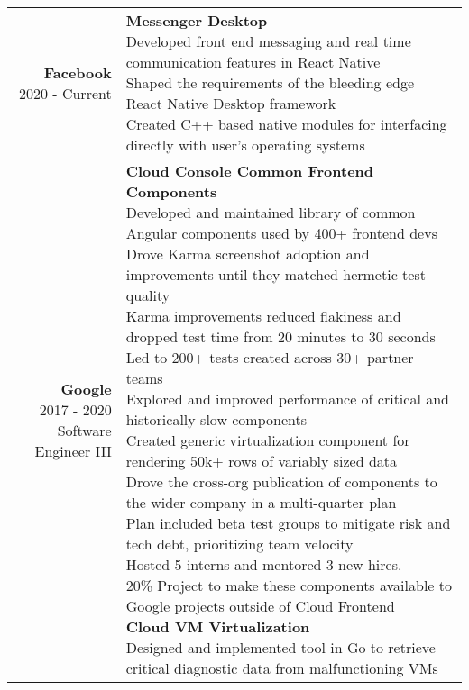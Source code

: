 \documentclass{article}
\makeatletter
\newcommand*\lineBr[2][c]{\begin{tabular}[#1]{@{}r@{}}#2\end{tabular}}
\newcommand*\lineBl[2][c]{\begin{tabular}[#1]{@{}l@{}}#2\end{tabular}}
\makeatother
\begin{document}
\begin{tabularx}{\textwidth}{ r | X }
  \vspace{4mm}
  \lineBr{ {\large {\bf Facebook }\\[2mm]2020 - Current}} &
  \lineBl{
    {\bf Messenger Desktop} \\[2mm]
    Developed front end messaging and real time communication features in React Native \\[2mm]
    Shaped the requirements of the bleeding edge React Native Desktop framework \\[2mm]
    Created C++ based native modules for interfacing directly with user's operating systems \\[2mm]
  } \\
  \vspace{4mm}
  \lineBr{ {\large {\bf Google }\\[2mm]2017 - 2020\\[2mm]Software Engineer III}} &
  \lineBl{
    {\bf Cloud Console Common Frontend Components} \\[2mm]
    Developed and maintained library of common Angular components used by 400+ frontend devs \\[2mm]
    Drove Karma screenshot adoption and improvements until they matched hermetic test quality \\[2mm]
    Karma improvements reduced flakiness and dropped test time from 20 minutes to 30 seconds \\[2mm]
    Led to 200+ tests created across 30+ partner teams \\[2mm]
    Explored and improved performance of critical and historically slow components \\[2mm]
    Created generic virtualization component for rendering 50k+ rows of variably sized data \\[2mm]
	Drove the cross-org publication of components to the wider company in a multi-quarter plan \\[2mm]
	Plan included beta test groups to mitigate risk and tech debt, prioritizing team velocity \\[2mm]
    Hosted 5 interns and mentored 3 new hires. \\[2mm]
    20\% Project to make these components available to Google projects outside of Cloud Frontend \\[4mm]
    {\bf Cloud VM Virtualization} \\[2mm]
    Designed and implemented tool in Go to retrieve critical diagnostic data from malfunctioning VMs \\[2mm]
}
\end{tabularx}
\end{document}
